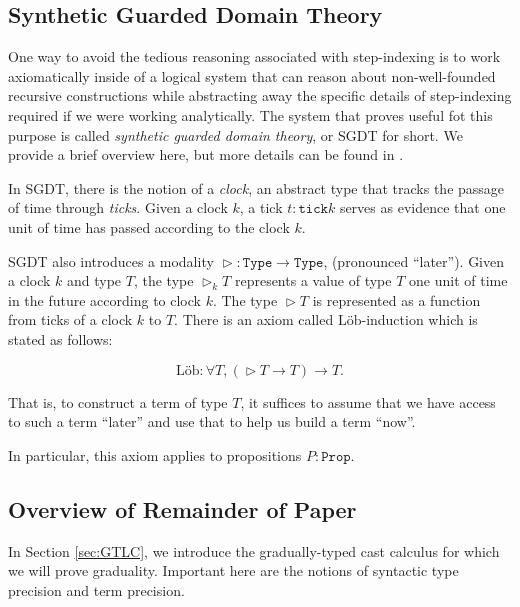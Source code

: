 \documentclass[acmsmall,screen]{acmart}
\newcommand{\later}{\vartriangleright}
\newcommand{\type}{\texttt{Type}}
\newcommand{\lob}{\text{L\"{o}b}}
\newcommand{\tick}{\texttt{tick}}
\begin{document}

  

  \subsection{Synthetic Guarded Domain Theory}
  One way to avoid the tedious reasoning associated with step-indexing is to work
  axiomatically inside of a logical system that can reason about non-well-founded recursive
  constructions while abstracting away the specific details of step-indexing required
  if we were working analytically.
  The system that proves useful fot this purpose is called \emph{synthetic guarded
  domain theory}, or SGDT for short. We provide a brief overview here, but more
  details can be found in \cite{TODO}.

  In SGDT, there is the notion of a \emph{clock}, an abstract type that tracks the
  passage of time through \emph{ticks}. Given a clock $k$, a tick $t : \tick k$ serves
  as evidence that one unit of time has passed according to the clock $k$.

  SGDT also introduces a modality $\later : \type \to \type$, (pronounced ``later'').
  Given a clock $k$ and type $T$, the type $\later_k T$ represents a value of type
  $T$ one unit of time in the future according to clock $k$.
  The type $\later T$ is represented as a function from ticks of a clock $k$ to $T$.
  There is an axiom called $\lob$-induction which is stated as follows:

  \[
    \lob : \forall T, (\later T \to T) \to T.
  \]

  That is, to construct a term of type $T$, it suffices to assume that we have access to
  such a term ``later'' and use that to help us build a term ``now''.

  In particular, this axiom applies to propositions $P : \texttt{Prop}$.







  \subsection{Overview of Remainder of Paper}
  In Section \ref{sec:GTLC}, we introduce the gradually-typed cast calculus
  for which we will prove graduality. Important here are the notions of syntactic
  type precision and term precision.
\end{document}
